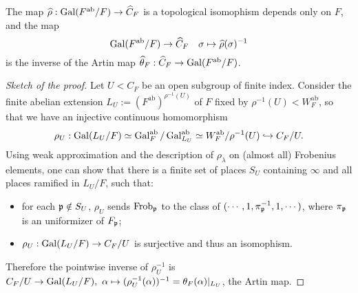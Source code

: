 \documentclass{article}
\DeclareMathOperator{\frob}{Frob}
\newcommand{\ab}{\mathrm{ab}}
\begin{document}
\begin{theorem}\label{inverse of Artin map}
    The map $\hat\rho : \gal(F^\ab/F)\to \hat{C}_F$ is a topological isomophism depends only on $F$,
    and the map \[\gal(F^\ab/F)\to \hat{C}_F\quad \sigma\mapsto \hat\rho(\sigma)^{-1}\]
    is the inverse of the Artin map $\hat\theta_F : \hat C_F\to \gal(F^\ab/F)$.
\end{theorem}
\begin{proof}[Sketch of the proof]

Let $U < C_F$ be an open subgroup of finite index.
Consider the finite abelian extension $L_U := (F^\ab)^{\rho^{-1}(U)}$ of $F$ fixed by $\rho^{-1}(U) < W_F^\ab$,
so that
we have an injective continuous homomorphism
\[\rho_U : \gal(L_U/F) \simeq\gal_F^\ab/\gal_{L_U}^\ab \simeq W_F^\ab/\rho^{-1}(U)\hookrightarrow C_F/U.\]
Using weak approximation and the description of $\rho_\lambda$ on (almost all) Frobenius elements,
one can show that there is a finite set of places $S_U$ containing $\infty$ and all places ramified in $L_U/F$, such that:
\begin{itemize}
    \item for each $\mathfrak{p}\notin S_U$, $\rho_U$ sends $\frob_\p$ to the class of $(\cdots, 1, \pi_{\mathfrak{p}}^{-1}, 1, \cdots)$, where $\pi_{\mathfrak{p}}$ is an uniformizer of $F_{\mathfrak{p}}$;
    \item $\rho_U : \operatorname{Gal}(L_U/F)\to C_F/U$ is surjective and thus an isomophism.
\end{itemize}
Therefore the pointwise inverse of $\rho_U^{-1}$ is
$C_F/U\to \operatorname{Gal}(L_U/F),\ \alpha\mapsto (\rho_U^{-1}(\alpha))^{-1} = \theta_F(\alpha)|_{L_U}$, the Artin map.


\end{proof}
\end{document}
